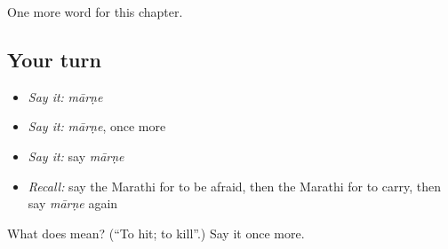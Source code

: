 \begin{grammarlens}[title={What you've built}]
One more word for this chapter.
\end{grammarlens}

\subsection*{Your turn}
\begin{itemize}
\raggedright
  \item \emph{Say it:} \emph{mārṇe}
  \item \emph{Say it:} \emph{mārṇe}, once more
  \item \emph{Say it:} say \emph{mārṇe}
  \item \emph{Recall:} say the Marathi for to be afraid, then the Marathi for to carry, then say \emph{mārṇe} again
\end{itemize}

\begin{tcolorbox}[breakable,colback=teal!4,colframe=teal!35!black,title={Before you move on}]
What does  mean? (\textquotedblleft{}To hit; to kill\textquotedblright{}.) Say it once more.
\end{tcolorbox}
